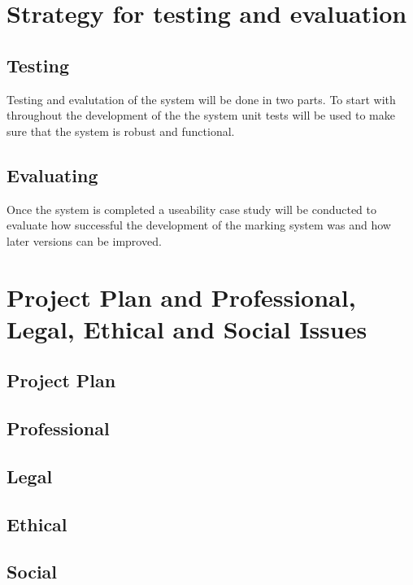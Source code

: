 \documentclass[12pt]{article}  %
\theoremstyle{definition}
\theoremstyle{remark}
\begin{document}
\newpage
\section{Strategy for testing and evaluation}

\subsection{Testing}
Testing and evalutation of the system will be done in two parts. To start with throughout the development of the the system unit tests will be used to make sure that the system is robust and functional. \\

\subsection{Evaluating}
Once the system is completed a useability case study will be conducted to evaluate how successful the development of the marking system  was and how later versions can be improved.


\newpage
\section{Project Plan and Professional, Legal, Ethical and Social Issues}

\subsection{Project Plan}

\subsection{Professional}

\subsection{Legal}

\subsection{Ethical}

\subsection{Social}
\end{document}
